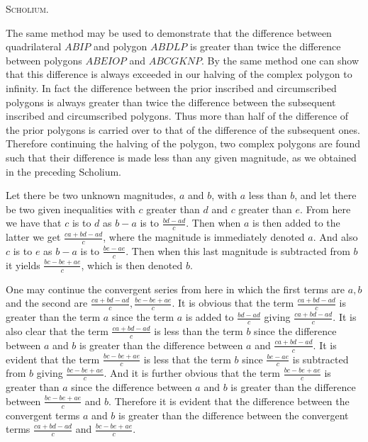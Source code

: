 \documentclass[11pt,letterpaper]{book}
\begin{document}
\begin{samepage}
\begin{center}
\large\textsc{Scholium.}
\end{center}

The same method may be used to demonstrate that the difference
between quadrilateral $ABIP$ and polygon $ABDLP$ is greater than twice the
difference between polygons $ABEIOP$ and $ABCGKNP$. By the same method
one can show that this difference is always exceeded in our halving
of the complex polygon to infinity. In fact the difference between the prior
inscribed and circumscribed polygons is always greater than twice the difference
between the subsequent inscribed and circumscribed polygons. Thus more than half
of the difference of the prior polygons is carried over to that of the
difference of the subsequent ones. Therefore continuing the halving of the
polygon, two complex polygons are found such that their difference is made
less than any given magnitude, as we obtained in the preceding Scholium.
\end{samepage}

Let there be two unknown magnitudes, $a$ and $b$, with $a$ less than $b$, and
let there be two given inequalities with $c$ greater than $d$ and $c$ 
greater than $e$. From here we have that $c$ is to $d$ as $b - a$ is to
$\frac{bd - ad}{c}$.  Then when $a$ is then added to the latter we get
$\frac{ca + bd - ad}{c}$, where the magnitude is immediately denoted $a$.
And also $c$ is to $e$ as $b - a$ is to $\frac{be - ae}{c}$. Then when this last
magnitude is subtracted from $b$ it yields $\frac{bc - be + ae}{c}$, which is
then denoted $b$.

One may continue the convergent series from here in which the first terms are
$a, b$ and the second are $\frac{ca+bd-ad}{c}, \frac{bc-be+ae}{c}$. It is
obvious that the term $\frac{ca+bd-ad}{c}$ is greater than the term $a$ since
the term $a$ is added to $\frac{bd-ad}{c}$ giving $\frac{ca+bd-ad}{c}$. It is
also clear that the term $\frac{ca+bd-ad}{c}$ is less than the term $b$ since the
difference between $a$ and $b$ is greater than the difference between $a$ and
$\frac{ca+bd-ad}{c}$. It is evident that the term $\frac{bc-be+ae}{c}$ is less
that the term $b$ since $\frac{be-ae}{c}$ is subtracted from $b$ giving
$\frac{bc-be+ae}{c}$. And it is further obvious that the term
$\frac{bc-be+ae}{c}$ is greater than $a$ since the difference between $a$ and
$b$ is greater than the difference between $\frac{bc-be+ae}{c}$ and $b$.
Therefore it is evident that the difference between the convergent terms $a$ and
$b$ is greater than the difference between the convergent terms
$\frac{ca+bd-ad}{c}$ and $\frac{bc-be+ae}{c}$.
\end{document}
